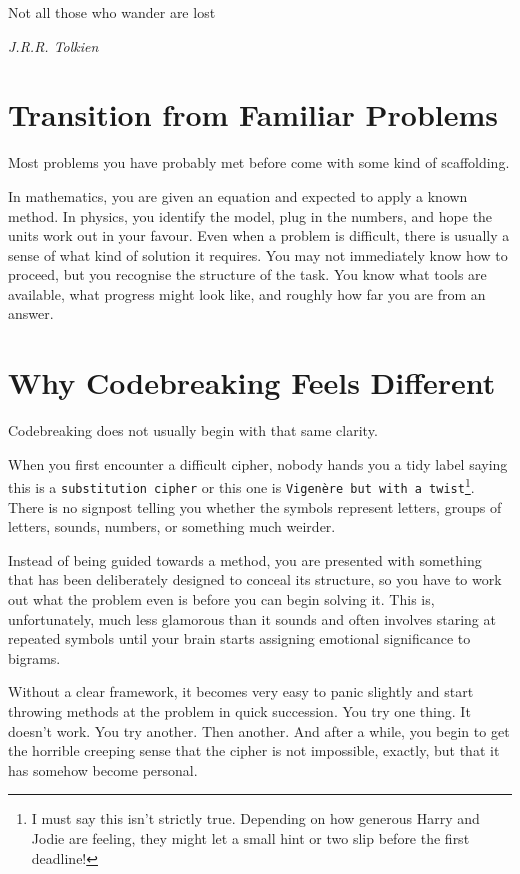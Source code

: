 \epigraph{Not all those who wander are lost}
{\textit{J.R.R. Tolkien}}

\section{Transition from Familiar Problems}

Most problems you have probably met before come with some kind of scaffolding.

In mathematics, you are given an equation and expected to apply a known method. In physics, you identify the model, plug in the numbers, and hope the units work out in your favour. Even when a problem is difficult, there is usually a sense of what kind of solution it requires. You may not immediately know how to proceed, but you recognise the structure of the task. You know what tools are available, what progress might look like, and roughly how far you are from an answer.

\section{Why Codebreaking Feels Different}

Codebreaking does not usually begin with that same clarity.

When you first encounter a difficult cipher, nobody hands you a tidy label saying this is a \texttt{substitution cipher} or this one is \texttt{Vigenère but with a twist}\footnote{I must say this isn't strictly true. Depending on how generous Harry and Jodie are feeling, they might let a small hint or two slip before the first deadline!}. There is no signpost telling you whether the symbols represent letters, groups of letters, sounds, numbers, or something much weirder.

Instead of being guided towards a method, you are presented with something that has been deliberately designed to conceal its structure, so you have to work out what the problem even is before you can begin solving it. This is, unfortunately, much less glamorous than it sounds and often involves staring at repeated symbols until your brain starts assigning emotional significance to bigrams.

Without a clear framework, it becomes very easy to panic slightly and start throwing methods at the problem in quick succession. You try one thing. It doesn't work. You try another. Then another. And after a while, you begin to get the horrible creeping sense that the cipher is not impossible, exactly, but that it has somehow become personal.

